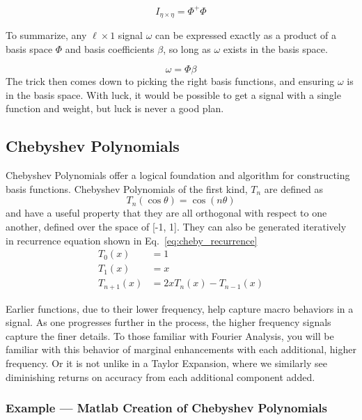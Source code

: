 \begin{equation}
    I_{\eta \times \eta} = \Phi^+ \Phi
    \label{eq:identity_of_basis_spaces}
\end{equation}

To summarize, any $\ell \times 1$ signal $\omega$ can be expressed exactly as a product of a basis space $\Phi$ and basis coefficients $\beta$, so long as $\omega$ exists in the basis space.

\begin{equation}
    \omega = \Phi \beta
    \label{eq:basis_definition}
\end{equation}
The trick then comes down to picking the right basis functions, and ensuring $\omega$ is in the basis space. With luck, it would be possible to get a signal with a single function and weight, but luck is never a good plan.

\FloatBarrier\subsection{Chebyshev Polynomials}
Chebyshev Polynomials offer a logical foundation and algorithm for constructing basis functions. Chebyshev Polynomials of the first kind, $T_n$ are defined as
\begin{equation}
    T_n(\cos \theta) = \cos(n\theta)
    \label{eq:full_cheby_def}
\end{equation}
and have a useful property that they are all orthogonal with respect to one another, defined over the space of [-1, 1]. They can also be generated iteratively in recurrence equation shown in Eq.~\ref{eq:cheby_recurrence}
\begin{align}
    T_0(x) &= 1 \label{eq:cheby_T0}\\
    T_1(x) &= x \label{eq:cheby_T1}\\
    T_{n+1}(x) &= 2xT_n(x) - T_{n-1}(x)\label{eq:cheby_recurrence}
\end{align}

Earlier functions, due to their lower frequency, help capture macro behaviors in a signal. As one progresses further in the process, the higher frequency signals capture the finer details. To those familiar with Fourier Analysis, you will be familiar with this behavior of marginal enhancements with each additional, higher frequency. Or it is not unlike in a Taylor Expansion, where we similarly see diminishing returns on accuracy from each additional component added. 

\FloatBarrier\subsubsection{Example --- Matlab Creation of Chebyshev Polynomials}

